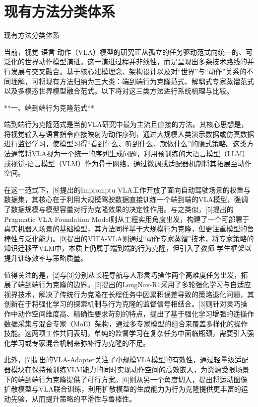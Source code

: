 \documentclass{article}
\begin{document}
\section{现有方法分类体系}

现有方法分类体系

当前，视觉-语言-动作（VLA）模型的研究正从孤立的任务驱动范式向统一的、可泛化的世界动作模型演进。这一演进过程并非线性，而是呈现出多条技术路线的并行发展与交叉融合。基于核心建模理念、架构设计以及对“世界”与“动作”关系的不同理解，可将现有方法归纳为三大类：端到端行为克隆范式、解耦式专家蒸馏范式以及多模态世界模型融合范式。以下将对这三类方法进行系统梳理与比较。

**一、端到端行为克隆范式**

端到端行为克隆范式是当前VLA研究中最为主流且直接的方法。其核心思想是，将视觉输入与语言指令直接映射为动作序列，通过大规模人类演示数据或仿真数据进行监督学习，使模型习得“看到什么、听到什么、就做什么”的隐式策略。这类方法通常将VLA视为一个统一的序列生成问题，利用预训练的大语言模型（LLM）或视觉-语言模型（VLM）作为骨干网络，通过微调或适配器机制将其拓展至动作空间。

在这一范式下，[8]提出的Impromptu VLA工作开放了面向自动驾驶场景的权重与数据集，其核心在于利用大规模驾驶数据直接训练一个端到端的VLA模型，强调了数据规模与模型容量对行为克隆效果的决定性作用。与之类似，[5]提出的Pragmatic VLA Foundation Model则从工程实用角度出发，构建了一个可部署于真实机器人场景的基础模型，其方法同样基于大规模行为克隆，但更注重模型的鲁棒性与泛化能力。[9]提出的VITA-VLA则通过“动作专家蒸馏”技术，将专家策略的知识迁移至VLM中，本质上仍属于端到端的行为克隆，但引入了教师-学生框架以提升训练效率与策略质量。

值得关注的是，[2]与[3]分别从长程导航与人形灵巧操作两个高难度任务出发，拓展了端到端行为克隆的边界。[2]提出的LongNav-R1采用了多轮强化学习与自适应视界技术，解决了传统行为克隆在长程任务中因累积误差导致的策略退化问题，其创新在于将强化学习的探索机制与行为克隆的监督信号相结合。[3]则针对灵巧操作中动作空间维度高、精确性要求苛刻的特点，提出了基于强化学习增强的遥操作数据采集与混合专家（MoE）架构，通过多专家模型的组合来覆盖多样化的操作技能。这两项工作共同表明，单纯的监督学习在复杂任务中面临瓶颈，需要引入强化学习或专家混合机制来弥补行为克隆的不足。

此外，[7]提出的VLA-Adapter关注了小规模VLA模型的有效性，通过轻量级适配器模块在保持预训练VLM能力的同时实现动作空间的高效嵌入，为资源受限场景下的端到端行为克隆提供了可行方案。[6]则从另一个角度切入，提出将运动图像扩散模型与VLA联合训练，利用扩散模型的生成能力为行为克隆提供更丰富的运动先验，从而提升策略的平滑性与鲁棒性。
\end{document}

